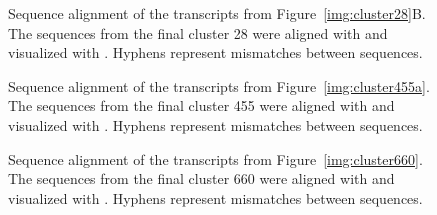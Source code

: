 \documentclass[12pt,a4paper,english]{article}
\begin{document}
\begin{figure}
	\centering
	\def\svgwidth{\textwidth}
	
	\caption[Sequence alignment of the transcripts from Figure~\ref{img:cluster28}B.]{Sequence alignment of the transcripts from Figure~\ref{img:cluster28}B. The sequences from the final cluster 28 were aligned with \muscle \citep{muscle:04} and visualized with \jalview \citep{jalview:09}. Hyphens represent mismatches between sequences.}
	\label{img:aln:case1}
\end{figure}

\begin{figure}
	\centering
	\def\svgwidth{\textwidth}
	
	\caption[Sequence alignment of the transcripts from Figure~\ref{img:cluster455a}.]{Sequence alignment of the transcripts from Figure~\ref{img:cluster455a}. The sequences from the final cluster 455 were aligned with \muscle \citep{muscle:04} and visualized with \jalview \citep{jalview:09}. Hyphens represent mismatches between sequences.}
	\label{img:aln:case2}
\end{figure}


\begin{figure}
	\def\svgwidth{\textwidth}
	\centering
	
	\caption[Sequence alignment of the transcripts from Figure~\ref{img:cluster660}.]{Sequence alignment of the transcripts from Figure~\ref{img:cluster660}. The sequences from the final cluster 660 were aligned with \muscle \citep{muscle:04} and visualized with \jalview \citep{jalview:09}. Hyphens represent mismatches between sequences.}
	\label{img:aln:case3}
\end{figure}
\end{document}
